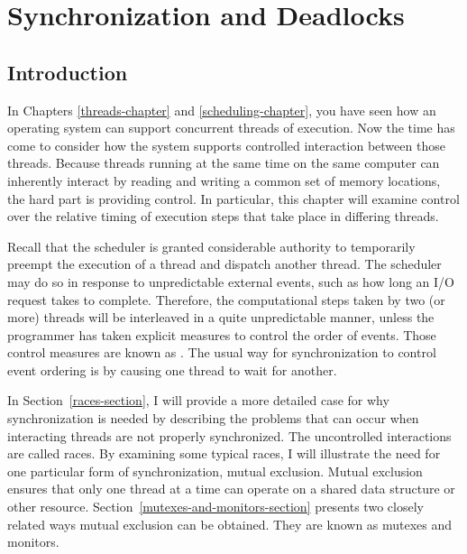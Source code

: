 \chapter{Synchronization and Deadlocks}
\label{synchronization-chapter}
\section{Introduction}

In Chapters \ref{threads-chapter} and \ref{scheduling-chapter}, you have seen how an operating system
can support concurrent threads of execution.  Now the time has come
to consider how the system supports controlled interaction
between those threads.  Because threads running at the same time on
the same computer can inherently interact by reading and writing a
common set of memory locations, the hard part is providing control.
In particular, this chapter will examine control over the
relative timing of execution steps that take place in differing
threads.

Recall that the scheduler is granted considerable authority to
temporarily preempt the execution of a thread and dispatch another
thread.  The scheduler may do so in response to unpredictable external
events, such as how long an I/O request takes to complete.  Therefore,
the computational steps taken by two (or more) threads will be
interleaved in a quite unpredictable manner, unless the programmer has
taken explicit measures to control the order of events.  Those control
measures are known as .
The usual way for synchronization to control event ordering is by causing
one thread to wait for another.

In Section~\ref{races-section}, I will provide a more detailed case for why
synchronization is needed by describing the problems that can occur
when interacting threads are not properly synchronized.  The
uncontrolled interactions are called races.  By examining some
typical races, I will illustrate the need for one particular form of
synchronization, mutual exclusion.  Mutual exclusion ensures that only
one
thread at a time can operate on a shared data structure or other
resource.  Section~\ref{mutexes-and-monitors-section} presents two
closely related ways mutual exclusion can be obtained. They are known as mutexes and monitors.

